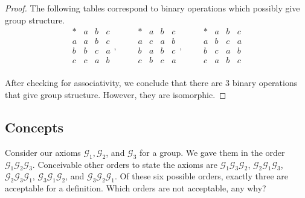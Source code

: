 \begin{proof}
    The following tables correspond to binary operations which possibly give group structure.
    \[
        \begin{array}{c|ccc}
            * & a & b & c \\
            \hline
            a & a & b & c \\
            b & b & c & a \\
            c & c & a & b \\
        \end{array},\qquad
        \begin{array}{c|ccc}
            * & a & b & c \\
            \hline
            a & c & a & b \\
            b & a & b & c \\
            c & b & c & a \\
        \end{array},\qquad
        \begin{array}{c|ccc}
            * & a & b & c \\
            \hline
            a & b & c & a \\
            b & c & a & b \\
            c & a & b & c \\
        \end{array}
    \]

    After checking for associativity, we conclude that there are $3$ binary operations that give group structure. However, they are isomorphic.
\end{proof}

\subsection*{Concepts}

\newpage
\begin{exercise}
    Consider our axioms $\mathscr{G}_{1}, \mathscr{G}_{2}$, and $\mathscr{G}_{3}$ for a group. We gave them in the order $\mathscr{G}_{1}\mathscr{G}_{2}\mathscr{G}_{3}$. Conceivable other orders to state the axioms are  $\mathscr{G}_{1}\mathscr{G}_{3}\mathscr{G}_{2}$, $\mathscr{G}_{2}\mathscr{G}_{1}\mathscr{G}_{3}$, $\mathscr{G}_{2}\mathscr{G}_{3}\mathscr{G}_{1}$, $\mathscr{G}_{3}\mathscr{G}_{1}\mathscr{G}_{2}$, and $\mathscr{G}_{3}\mathscr{G}_{2}\mathscr{G}_{1}$. Of these six possible orders, exactly three are acceptable for a definition. Which orders are not acceptable, any why?
\end{exercise}


